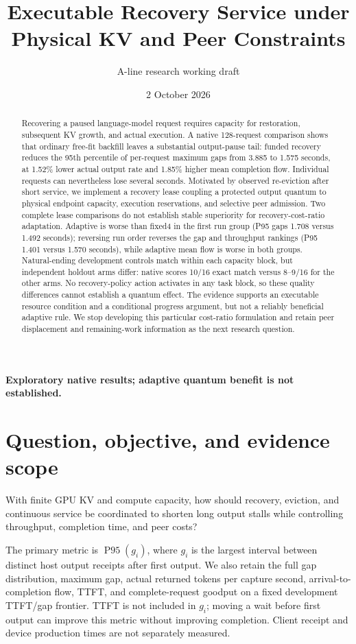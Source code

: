 \documentclass[10pt]{article}
\title{Executable Recovery Service under Physical KV and Peer Constraints}
\author{A-line research working draft}
\date{2 October 2026}
\begin{document}
\maketitle
\begin{center}\textbf{Exploratory native results; adaptive quantum benefit is not established.}\end{center}
\begin{abstract}
Recovering a paused language-model request requires capacity for restoration, subsequent KV growth, and actual execution. A native 128-request comparison shows that ordinary free-fit backfill leaves a substantial output-pause tail: funded recovery reduces the 95th percentile of per-request maximum gaps from 3.885 to 1.575 seconds, at 1.52\% lower actual output rate and 1.85\% higher mean completion flow. Individual requests can nevertheless lose several seconds. Motivated by observed re-eviction after short service, we implement a recovery lease coupling a protected output quantum to physical endpoint capacity, execution reservations, and selective peer admission. Two complete lease comparisons do not establish stable superiority for recovery-cost-ratio adaptation. Adaptive is worse than fixed4 in the first run group (P95 gaps 1.708 versus 1.492 seconds); reversing run order reverses the gap and throughput rankings (P95 1.401 versus 1.570 seconds), while adaptive mean flow is worse in both groups. Natural-ending development controls match within each capacity block, but independent holdout arms differ: native scores 10/16 exact match versus 8--9/16 for the other arms. No recovery-policy action activates in any task block, so these quality differences cannot establish a quantum effect. The evidence supports an executable resource condition and a conditional progress argument, but not a reliably beneficial adaptive rule. We stop developing this particular cost-ratio formulation and retain peer displacement and remaining-work information as the next research question.
\end{abstract}

\section{Question, objective, and evidence scope}
With finite GPU KV and compute capacity, how should recovery, eviction, and continuous service be coordinated to shorten long output stalls while controlling throughput, completion time, and peer costs?

The primary metric is $\operatorname{P95}(g_i)$, where $g_i$ is the largest interval between distinct host output receipts after first output. We also retain the full gap distribution, maximum gap, actual returned tokens per capture second, arrival-to-completion flow, TTFT, and complete-request goodput on a fixed development TTFT/gap frontier. TTFT is not included in $g_i$; moving a wait before first output can improve this metric without improving completion. Client receipt and device production times are not separately measured.
\end{document}
